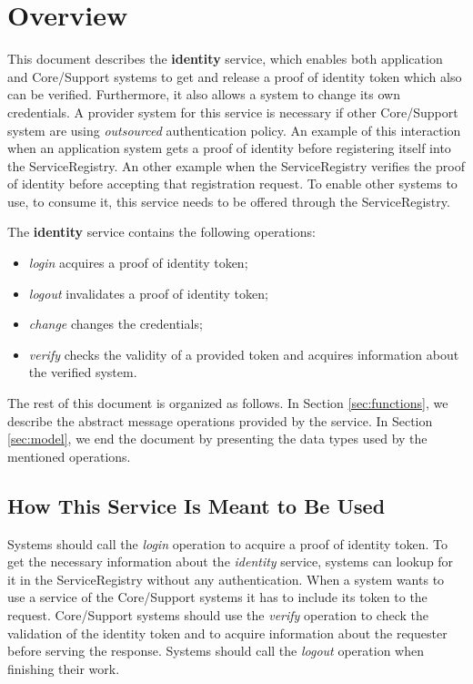\documentclass[a4paper]{arrowhead}
\begin{document}
\section{Overview}
\label{sec:overview}
This document describes the \textbf{identity} service, which enables both application and Core/Support systems to get and release a proof of identity token which also can be verified. Furthermore, it also allows a system to change its own credentials. A provider system for this service is necessary if other Core/Support system are using \textit{outsourced} authentication policy. An example of this interaction when an application system gets a proof of identity before registering itself into the ServiceRegistry. An other example when the ServiceRegistry verifies the proof of identity before accepting that registration request. To enable other systems to use, to consume it, this service needs to be offered through the ServiceRegistry.

The \textbf{identity} service contains the following operations:

\begin{itemize}
    \item \textit{login} acquires a proof of identity token;
    \item \textit{logout} invalidates a proof of identity token;
    \item \textit{change} changes the credentials;
    \item \textit{verify} checks the validity of a provided token and acquires information about the verified system.
\end{itemize}

The rest of this document is organized as follows.
In Section \ref{sec:functions}, we describe the abstract message operations provided by the service.
In Section \ref{sec:model}, we end the document by presenting the data types used by the mentioned operations.

\subsection{How This Service Is Meant to Be Used}
Systems should call the \textit{login} operation to acquire a proof of identity token. To get the necessary information about the \textit{identity} service, systems can lookup for it in the ServiceRegistry without any authentication. When a system wants to use a service of the Core/Support systems it has to include its token to the request. Core/Support systems should use the \textit{verify} operation to check the validation of the identity token and to acquire information about the requester before serving the response. Systems should call the \textit{logout} operation when finishing their work.
\end{document}
